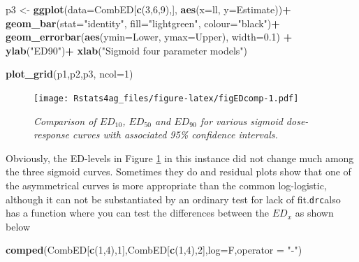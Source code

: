 \documentclass[letterpaper,]{book}
\newenvironment{Shaded}{\begin{snugshade}}{\end{snugshade}}
\newcommand{\DataTypeTok}[1]{\textcolor[rgb]{0.13,0.29,0.53}{#1}}
\newcommand{\DecValTok}[1]{\textcolor[rgb]{0.00,0.00,0.81}{#1}}
\newcommand{\FloatTok}[1]{\textcolor[rgb]{0.00,0.00,0.81}{#1}}
\newcommand{\KeywordTok}[1]{\textcolor[rgb]{0.13,0.29,0.53}{\textbf{#1}}}
\newcommand{\NormalTok}[1]{#1}
\newcommand{\OperatorTok}[1]{\textcolor[rgb]{0.81,0.36,0.00}{\textbf{#1}}}
\newcommand{\StringTok}[1]{\textcolor[rgb]{0.31,0.60,0.02}{#1}}
\begin{document}
\begin{Shaded}
\begin{Highlighting}[]
\NormalTok{p3 <-}\StringTok{ }\KeywordTok{ggplot}\NormalTok{(}\DataTypeTok{data=}\NormalTok{CombED[}\KeywordTok{c}\NormalTok{(}\DecValTok{3}\NormalTok{,}\DecValTok{6}\NormalTok{,}\DecValTok{9}\NormalTok{),], }\KeywordTok{aes}\NormalTok{(}\DataTypeTok{x=}\NormalTok{ll, }\DataTypeTok{y=}\NormalTok{Estimate))}\OperatorTok{+}
\KeywordTok{geom_bar}\NormalTok{(}\DataTypeTok{stat=}\StringTok{"identity"}\NormalTok{, }\DataTypeTok{fill=}\StringTok{"lightgreen"}\NormalTok{, }\DataTypeTok{colour=}\StringTok{"black"}\NormalTok{)}\OperatorTok{+}
\StringTok{  }\KeywordTok{geom_errorbar}\NormalTok{(}\KeywordTok{aes}\NormalTok{(}\DataTypeTok{ymin=}\NormalTok{Lower, }\DataTypeTok{ymax=}\NormalTok{Upper), }\DataTypeTok{width=}\FloatTok{0.1}\NormalTok{) }\OperatorTok{+}
\StringTok{  }\KeywordTok{ylab}\NormalTok{(}\StringTok{"ED90"}\NormalTok{)}\OperatorTok{+}
\StringTok{  }\KeywordTok{xlab}\NormalTok{(}\StringTok{"Sigmoid four parameter models"}\NormalTok{)}

\KeywordTok{plot_grid}\NormalTok{(p1,p2,p3, }\DataTypeTok{ncol=}\DecValTok{1}\NormalTok{)}
\end{Highlighting}
\end{Shaded}

\begin{figure}
\centering
\texttt{[image: Rstats4ag\_files/figure-latex/figEDcomp-1.pdf]}
\caption{\label{fig:figEDcomp}\emph{Comparison of \(ED_{10}\), \(ED_{50}\) and \(ED_{90}\) for various sigmoid dose-response curves with associated 95\% confidence intervals.}}
\end{figure}

Obviously, the ED-levels in Figure \ref{fig:figEDcomp} in this instance did not change much among the three sigmoid curves. Sometimes they do and residual plots show that one of the asymmetrical curves is more appropriate than the common log-logistic, although it can not be substantiated by an ordinary test for lack of fit.\texttt{drc}also has a function where you can test the differences between the \(ED_{x}\) as shown below

\begin{Shaded}
\begin{Highlighting}[]
\KeywordTok{comped}\NormalTok{(CombED[}\KeywordTok{c}\NormalTok{(}\DecValTok{1}\NormalTok{,}\DecValTok{4}\NormalTok{),}\DecValTok{1}\NormalTok{],CombED[}\KeywordTok{c}\NormalTok{(}\DecValTok{1}\NormalTok{,}\DecValTok{4}\NormalTok{),}\DecValTok{2}\NormalTok{],}\DataTypeTok{log=}\NormalTok{F,}\DataTypeTok{operator =} \StringTok{"-"}\NormalTok{)}
\end{Highlighting}
\end{Shaded}
\end{document}
